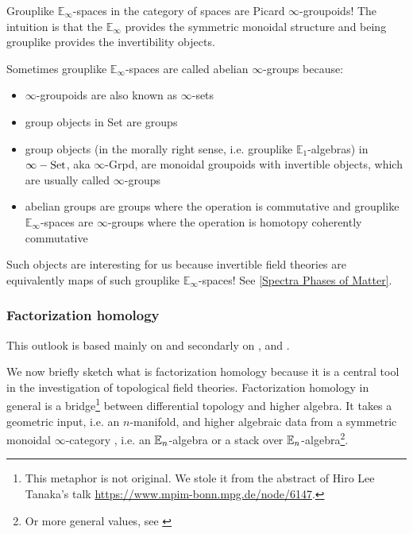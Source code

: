 \begin{rem}
    Grouplike $\mathbb{E}_\infty$-spaces in the category of spaces are
    Picard $\infty$-groupoids! The intuition is that the $\mathbb{E}_\infty$ provides
    the symmetric monoidal structure and being grouplike provides the invertibility
    objects. 
    \begin{notat}
        Sometimes grouplike $\mathbb{E}_\infty$-spaces are called abelian $\infty$-groups 
        because:
        \begin{itemize}
            \item $\infty$-groupoids are also known as $\infty$-sets 
            \item group objects in Set are
            groups
            \item group objects (in the morally right sense, i.e. grouplike $\mathbb{E}_1$-algebras) in $\infty-\operatorname{Set}$,
            aka $\infty$-Grpd,
            are monoidal groupoids with invertible objects, which are usually called $\infty$-groups
            \item abelian groups are groups where the operation is commutative and grouplike
            $\mathbb{E}_\infty$-spaces are $\infty$-groups where the operation is homotopy coherently  commutative
        \end{itemize}
    \end{notat}
    
    Such objects are interesting for us because invertible field theories are equivalently
    maps of such grouplike $\mathbb{E}_\infty$-spaces! See \ref{Spectra Phases of Matter}.
\end{rem}
\subsubsection{Factorization homology \extra}
This outlook is based mainly on \cite[10.5]{Mazel-Gee2024} and secondarly on
 \cite{ayala2019factorization},\cite{Scheimbauer:2014zty} and
 \cite{Tanaka_2020}.

We now briefly sketch what is factorization homology because it is a
central tool in the investigation of topological field theories.
Factorization homology in general is a bridge\footnote{This metaphor is not original. We stole it from the
     abstract of
Hiro Lee Tanaka's talk \url{https://www.mpim-bonn.mpg.de/node/6147}.} between differential topology
and higher algebra. It takes a geometric input, i.e. an $n$-manifold, and higher algebraic data from 
a symmetric monoidal $\infty$-category
, i.e. 
an $\mathbb{E}_n$-algebra or a stack over $\mathbb{E}_n$-algebra\footnote{Or more general values, see
     \cite{ayalacategories2020factorization}}.

